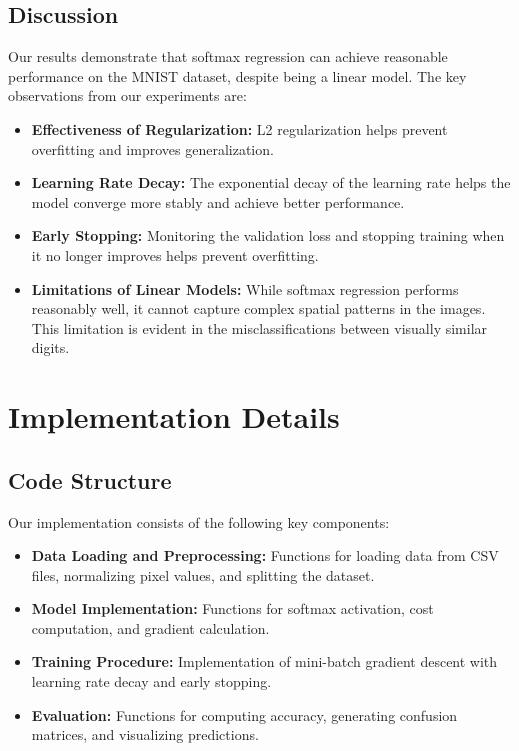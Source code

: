 \documentclass[10pt,journal,compsoc]{IEEEtran}
\begin{document}
\subsection{Discussion}
Our results demonstrate that softmax regression can achieve reasonable performance on the MNIST dataset, despite being a linear model. The key observations from our experiments are:

\begin{itemize}
    \item \textbf{Effectiveness of Regularization:} L2 regularization helps prevent overfitting and improves generalization.
    
    \item \textbf{Learning Rate Decay:} The exponential decay of the learning rate helps the model converge more stably and achieve better performance.
    
    \item \textbf{Early Stopping:} Monitoring the validation loss and stopping training when it no longer improves helps prevent overfitting.
    
    \item \textbf{Limitations of Linear Models:} While softmax regression performs reasonably well, it cannot capture complex spatial patterns in the images. This limitation is evident in the misclassifications between visually similar digits.
\end{itemize}

\section{Implementation Details}
\subsection{Code Structure}
Our implementation consists of the following key components:

\begin{itemize}
    \item \textbf{Data Loading and Preprocessing:} Functions for loading data from CSV files, normalizing pixel values, and splitting the dataset.
    
    \item \textbf{Model Implementation:} Functions for softmax activation, cost computation, and gradient calculation.
    
    \item \textbf{Training Procedure:} Implementation of mini-batch gradient descent with learning rate decay and early stopping.
    
    \item \textbf{Evaluation:} Functions for computing accuracy, generating confusion matrices, and visualizing predictions.
\end{itemize}
\end{document}
